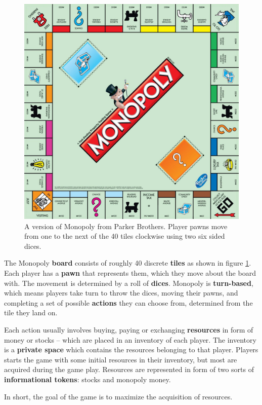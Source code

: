 \begin{figure}[ht]
\includegraphics[width=12cm]{img/monopoly_board}
\centering
\caption{A version of Monopoly from Parker Brothers. Player pawns move from one to the next of the 40 tiles clockwise using two six sided dices.}
\label{fig:monopoly_board}
\end{figure}

The Monopoly \textbf{board} consists of roughly 40 discrete \textbf{tiles} as shown in figure \ref{fig:monopoly_board}. Each player has a \textbf{pawn} that represents them, which they move about the board with. The movement is determined by a roll of \textbf{dices}. Monopoly is \textbf{turn-based}, which means players take turn to throw the dices, moving their pawns, and completing a set of possible \textbf{actions} they can choose from, determined from the tile they land on. 

Each action usually involves buying, paying or exchanging  \textbf{resources} in form of money or stocks – which are placed in an inventory of each player. The inventory is a \textbf{private space} which contains the resources belonging to that player. Players starts the game with some initial resources in their inventory, but most are acquired during the game play. Resources are represented in form of two sorts of \textbf{informational tokens}: stocks and monopoly money. 

In short, the goal of the game is to maximize the acquisition of resources.

